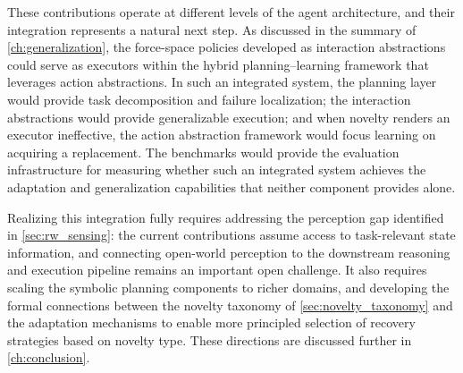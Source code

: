 These contributions operate at different levels of the agent architecture, and their integration represents a natural next step. As discussed in the summary of \cref{ch:generalization}, the force-space policies developed as interaction abstractions could serve as executors within the hybrid planning--learning framework that leverages action abstractions. In such an integrated system, the planning layer would provide task decomposition and failure localization; the interaction abstractions would provide generalizable execution; and when novelty renders an executor ineffective, the action abstraction framework would focus learning on acquiring a replacement. The benchmarks would provide the evaluation infrastructure for measuring whether such an integrated system achieves the adaptation and generalization capabilities that neither component provides alone.

Realizing this integration fully requires addressing the perception gap identified in \cref{sec:rw_sensing}: the current contributions assume access to task-relevant state information, and connecting open-world perception to the downstream reasoning and execution pipeline remains an important open challenge. It also requires scaling the symbolic planning components to richer domains, and developing the formal connections between the novelty taxonomy of \cref{sec:novelty_taxonomy} and the adaptation mechanisms to enable more principled selection of recovery strategies based on novelty type. These directions are discussed further in \cref{ch:conclusion}.